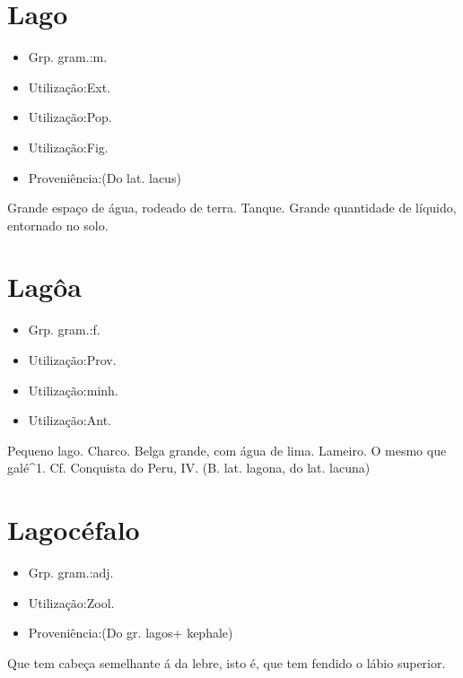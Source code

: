 \section{Lago}
\begin{itemize}
\item {Grp. gram.:m.}
\end{itemize}
\begin{itemize}
\item {Utilização:Ext.}
\end{itemize}
\begin{itemize}
\item {Utilização:Pop.}
\end{itemize}
\begin{itemize}
\item {Utilização:Fig.}
\end{itemize}
\begin{itemize}
\item {Proveniência:(Do lat. \textunderscore lacus\textunderscore )}
\end{itemize}
Grande espaço de água, rodeado de terra.
Tanque.
Grande quantidade de líquido, entornado no solo.
\section{Lagôa}
\begin{itemize}
\item {Grp. gram.:f.}
\end{itemize}
\begin{itemize}
\item {Utilização:Prov.}
\end{itemize}
\begin{itemize}
\item {Utilização:minh.}
\end{itemize}
\begin{itemize}
\item {Utilização:Ant.}
\end{itemize}
Pequeno lago.
Charco.
Belga grande, com água de lima.
Lameiro.
O mesmo que \textunderscore galé\textunderscore ^1. Cf. \textunderscore Conquista do Peru\textunderscore , IV.
(B. lat. \textunderscore lagona\textunderscore , do lat. \textunderscore lacuna\textunderscore )
\section{Lagocéfalo}
\begin{itemize}
\item {Grp. gram.:adj.}
\end{itemize}
\begin{itemize}
\item {Utilização:Zool.}
\end{itemize}
\begin{itemize}
\item {Proveniência:(Do gr. \textunderscore lagos\textunderscore  + \textunderscore kephale\textunderscore )}
\end{itemize}
Que tem cabeça semelhante á da lebre, isto é, que tem fendido o lábio superior.
